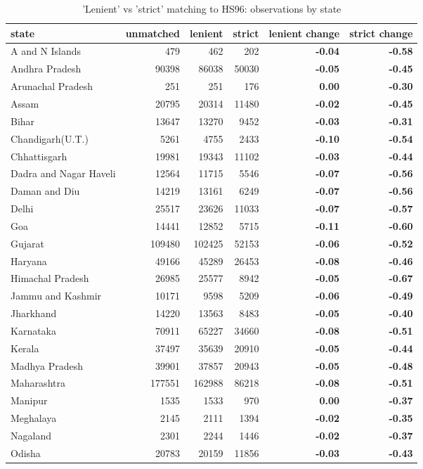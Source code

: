 \begin{table}

\caption{\label{tab:}'Lenient' vs 'strict' matching to HS96: observations by state}
\centering
\begin{tabular}[t]{lrrr>{\bfseries}r>{\bfseries}r}
\toprule
state & unmatched & lenient & strict & lenient change & strict change\\
\midrule
A and N Islands & 479 & 462 & 202 & -0.04 & -0.58\\
Andhra Pradesh & 90398 & 86038 & 50030 & -0.05 & -0.45\\
Arunachal Pradesh & 251 & 251 & 176 & 0.00 & -0.30\\
Assam & 20795 & 20314 & 11480 & -0.02 & -0.45\\
Bihar & 13647 & 13270 & 9452 & -0.03 & -0.31\\
\addlinespace
Chandigarh(U.T.) & 5261 & 4755 & 2433 & -0.10 & -0.54\\
Chhattisgarh & 19981 & 19343 & 11102 & -0.03 & -0.44\\
Dadra and Nagar Haveli & 12564 & 11715 & 5546 & -0.07 & -0.56\\
Daman and Diu & 14219 & 13161 & 6249 & -0.07 & -0.56\\
Delhi & 25517 & 23626 & 11033 & -0.07 & -0.57\\
\addlinespace
Goa & 14441 & 12852 & 5715 & -0.11 & -0.60\\
Gujarat & 109480 & 102425 & 52153 & -0.06 & -0.52\\
Haryana & 49166 & 45289 & 26453 & -0.08 & -0.46\\
Himachal Pradesh & 26985 & 25577 & 8942 & -0.05 & -0.67\\
Jammu and Kashmir & 10171 & 9598 & 5209 & -0.06 & -0.49\\
\addlinespace
Jharkhand & 14220 & 13563 & 8483 & -0.05 & -0.40\\
Karnataka & 70911 & 65227 & 34660 & -0.08 & -0.51\\
Kerala & 37497 & 35639 & 20910 & -0.05 & -0.44\\
Madhya Pradesh & 39901 & 37857 & 20943 & -0.05 & -0.48\\
Maharashtra & 177551 & 162988 & 86218 & -0.08 & -0.51\\
\addlinespace
Manipur & 1535 & 1533 & 970 & 0.00 & -0.37\\
Meghalaya & 2145 & 2111 & 1394 & -0.02 & -0.35\\
Nagaland & 2301 & 2244 & 1446 & -0.02 & -0.37\\
Odisha & 20783 & 20159 & 11856 & -0.03 & -0.43\\

\end{tabular}
\end{table}
